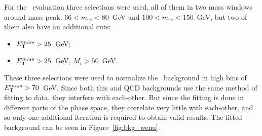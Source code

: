 For the \Wenu\ evaluation three selections were used, all of them in two mass windows around mass peak: $66 < m_{ee} < 80$~GeV and $100 < m_{ee} < 150$~GeV, but two of them also have an additional cuts:
\begin{itemize}
\item $E_{\mathrm{T}}^{miss} > 25$~GeV;
\item $E_{\mathrm{T}}^{miss} > 25$~GeV, $M_{t} > 50$~GeV.
\end{itemize}
These three selections were used to normalize the \Wenu\ background in high bins of $E_{\mathrm{T}}^{miss} > 70$~GeV. Since both this and QCD backgrounds use the same method of fitting to data, they interfere with each-other. But since the fitting is done in different parts of the phase space, they correlate very little with each-other, and so only one additional iteration is required to obtain valid results. The fitted background can be seen in Figure~\ref{fig:bkg_wenu}.

\begin{figure}
\end{figure}

